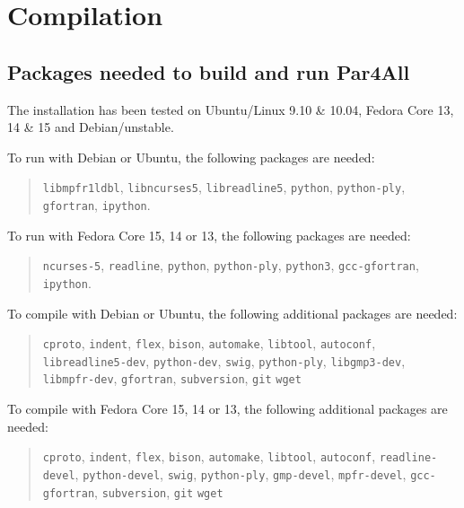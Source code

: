 \documentclass[a4paper]{article}
\begin{document}
\bigskip{}




\section{Compilation}
\label{sec:compilation}

\subsection{Packages needed to build and run Par4All}
\label{sec:pack-need-build}

The installation has been tested on Ubuntu/Linux 9.10 \& 10.04,
Fedora Core 13, 14 \& 15 and Debian/unstable.

To run \Apfa with Debian or Ubuntu, the following packages are needed:
\begin{quote}
  \texttt{libmpfr1ldbl},
  \texttt{libncurses5}, \texttt{libreadline5}, \texttt{python},
  \texttt{python-ply}, \texttt{gfortran},
  \texttt{ipython}.
\end{quote}

To run \Apfa with Fedora Core 15, 14 or 13, the following packages are needed:
\begin{quote}
  \texttt{ncurses-5}, \texttt{readline}, \texttt{python},
  \texttt{python-ply}, \texttt{python3}, \texttt{gcc-gfortran},
  \texttt{ipython}.
\end{quote}


To compile \Apfa with Debian or Ubuntu, the following additional
packages are needed:
\begin{quote}
  \texttt{cproto}, \texttt{indent}, \texttt{flex}, \texttt{bison},
  \texttt{automake}, \texttt{libtool}, \texttt{autoconf},
  \texttt{libreadline5-dev}, \texttt{python-dev}, \texttt{swig},
  \texttt{python-ply}, \texttt{libgmp3-dev},
  \texttt{libmpfr-dev}, \texttt{gfortran}, \texttt{subversion},
  \texttt{git} \texttt{wget}
\end{quote}

To compile \Apfa with Fedora Core 15, 14 or 13, the following additional
packages are needed:
\begin{quote}
  \texttt{cproto}, \texttt{indent}, \texttt{flex}, \texttt{bison},
  \texttt{automake}, \texttt{libtool}, \texttt{autoconf},
  \texttt{readline-devel}, \texttt{python-devel}, \texttt{swig},
  \texttt{python-ply}, \texttt{gmp-devel},
  \texttt{mpfr-devel}, \texttt{gcc-gfortran}, \texttt{subversion},
  \texttt{git} \texttt{wget}
\end{quote}
\end{document}
